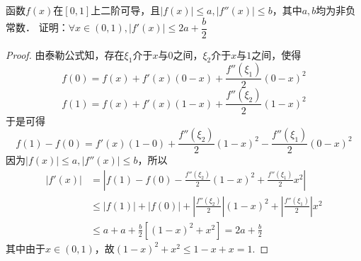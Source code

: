 \documentclass[12pt, a4paper, oneside, UTF8]{ctexbook}
\begin{document}
\begin{example}
    函数$f(x)$在$[0,1]$上二阶可导，且$|f(x)| \le a, |f''(x)| \le b$，其中$a,b$均为非负常数．
    证明：$\forall x \in (0,1), |f'(x)| \le 2a + \dfrac{b}{2}$
\end{example}
\begin{proof}
    由泰勒公式知，存在$\xi_1$介于$x$与$0$之间，$\xi_2$介于$x$与$1$之间，使得
    \[
        f(0)=f(x) + f'(x)(0 - x) + \frac{f''(\xi_1)}{2}(0 - x)^2
    \]
    \[
        f(1)=f(x) + f'(x)(1 - x) + \frac{f''(\xi_2)}{2}(1 - x)^2
    \]
    于是可得
    \[
        f(1)-f(0)=f'(x)(1 - 0) + \frac{f''(\xi_2)}{2}(1 - x)^2 - \frac{f''(\xi_1)}{2}(0 - x)^2
    \]
    因为$|f(x)| \le a, |f''(x)| \le b$，所以
    \begin{align*}
        |f'(x)|&=\left|f(1)-f(0) - \frac{f''(\xi_2)}{2}(1 - x)^2 + \frac{f''(\xi_1)}{2}x^2\right|\\
        &\le |f(1)| + |f(0)| + \left|\frac{f''(\xi_2)}{2}\right|(1 - x)^2 + \left|\frac{f''(\xi_1)}{2}\right| x^2\\
        &\le a + a + \frac{b}{2}[(1-x)^2 + x^2] = 2a + \frac{b}{2}
    \end{align*}
    其中由于$x \in (0,1)$，故$(1-x)^2 + x^2 \le 1-x+x =1$.
\end{proof}
\ifx\allfiles\undefined
\end{document}
